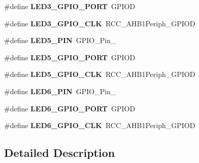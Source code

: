 \begin{DoxyCompactItemize}
\item 
\hypertarget{group___s_t_m32_f4___d_i_s_c_o_v_e_r_y___l_o_w___l_e_v_e_l___l_e_d_ga050f4b3a1f402476f9541dfe975d2143}{}\#define {\bfseries L\+E\+D3\+\_\+\+G\+P\+I\+O\+\_\+\+P\+O\+R\+T}~G\+P\+I\+O\+D\label{group___s_t_m32_f4___d_i_s_c_o_v_e_r_y___l_o_w___l_e_v_e_l___l_e_d_ga050f4b3a1f402476f9541dfe975d2143}

\item 
\hypertarget{group___s_t_m32_f4___d_i_s_c_o_v_e_r_y___l_o_w___l_e_v_e_l___l_e_d_gaf4e64981a3f4584fb771aa4cbc093c61}{}\#define {\bfseries L\+E\+D3\+\_\+\+G\+P\+I\+O\+\_\+\+C\+L\+K}~R\+C\+C\+\_\+\+A\+H\+B1\+Periph\+\_\+\+G\+P\+I\+O\+D\label{group___s_t_m32_f4___d_i_s_c_o_v_e_r_y___l_o_w___l_e_v_e_l___l_e_d_gaf4e64981a3f4584fb771aa4cbc093c61}

\item 
\hypertarget{group___s_t_m32_f4___d_i_s_c_o_v_e_r_y___l_o_w___l_e_v_e_l___l_e_d_ga1461b79814613e21bc6ebb5d8ae6e858}{}\#define {\bfseries L\+E\+D5\+\_\+\+P\+I\+N}~G\+P\+I\+O\+\_\+\+Pin\+\_\label{group___s_t_m32_f4___d_i_s_c_o_v_e_r_y___l_o_w___l_e_v_e_l___l_e_d_ga1461b79814613e21bc6ebb5d8ae6e858}

\item 
\hypertarget{group___s_t_m32_f4___d_i_s_c_o_v_e_r_y___l_o_w___l_e_v_e_l___l_e_d_gae157f2a0e9c947288518e6124b82aa74}{}\#define {\bfseries L\+E\+D5\+\_\+\+G\+P\+I\+O\+\_\+\+P\+O\+R\+T}~G\+P\+I\+O\+D\label{group___s_t_m32_f4___d_i_s_c_o_v_e_r_y___l_o_w___l_e_v_e_l___l_e_d_gae157f2a0e9c947288518e6124b82aa74}

\item 
\hypertarget{group___s_t_m32_f4___d_i_s_c_o_v_e_r_y___l_o_w___l_e_v_e_l___l_e_d_ga8c3cfa11e4916d221e3fc2fc9e24f19e}{}\#define {\bfseries L\+E\+D5\+\_\+\+G\+P\+I\+O\+\_\+\+C\+L\+K}~R\+C\+C\+\_\+\+A\+H\+B1\+Periph\+\_\+\+G\+P\+I\+O\+D\label{group___s_t_m32_f4___d_i_s_c_o_v_e_r_y___l_o_w___l_e_v_e_l___l_e_d_ga8c3cfa11e4916d221e3fc2fc9e24f19e}

\item 
\hypertarget{group___s_t_m32_f4___d_i_s_c_o_v_e_r_y___l_o_w___l_e_v_e_l___l_e_d_ga671c4f0e7ed8fbbfecc92cf6bdd0d588}{}\#define {\bfseries L\+E\+D6\+\_\+\+P\+I\+N}~G\+P\+I\+O\+\_\+\+Pin\+\_\label{group___s_t_m32_f4___d_i_s_c_o_v_e_r_y___l_o_w___l_e_v_e_l___l_e_d_ga671c4f0e7ed8fbbfecc92cf6bdd0d588}

\item 
\hypertarget{group___s_t_m32_f4___d_i_s_c_o_v_e_r_y___l_o_w___l_e_v_e_l___l_e_d_ga60dcbcf75e3ee091c1512f6ca9e00722}{}\#define {\bfseries L\+E\+D6\+\_\+\+G\+P\+I\+O\+\_\+\+P\+O\+R\+T}~G\+P\+I\+O\+D\label{group___s_t_m32_f4___d_i_s_c_o_v_e_r_y___l_o_w___l_e_v_e_l___l_e_d_ga60dcbcf75e3ee091c1512f6ca9e00722}

\item 
\hypertarget{group___s_t_m32_f4___d_i_s_c_o_v_e_r_y___l_o_w___l_e_v_e_l___l_e_d_ga252105acc9518f714ccdce1ef793661e}{}\#define {\bfseries L\+E\+D6\+\_\+\+G\+P\+I\+O\+\_\+\+C\+L\+K}~R\+C\+C\+\_\+\+A\+H\+B1\+Periph\+\_\+\+G\+P\+I\+O\+D\label{group___s_t_m32_f4___d_i_s_c_o_v_e_r_y___l_o_w___l_e_v_e_l___l_e_d_ga252105acc9518f714ccdce1ef793661e}

\end{DoxyCompactItemize}


\subsection{Detailed Description}
